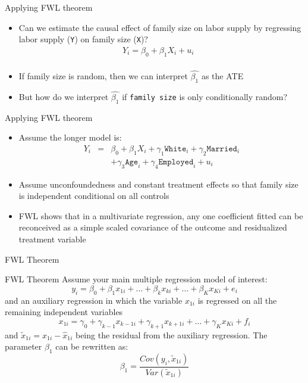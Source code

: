 \documentclass{beamer}
\begin{document}
\begin{frame}{Applying FWL theorem}

	\begin{itemize}
	\item Can we estimate the causal effect of family size on labor supply by regressing labor supply (\texttt{Y}) on family size (\texttt{X})?
		\begin{eqnarray*}
		Y_i = \beta_0 + \beta_1 X_i + u_i&\\
		\end{eqnarray*}
	\item If family size is random, then we can interpret $\widehat{\beta_1}$ as the ATE
	\item But how do we interpret $\widehat{\beta_1}$ if \texttt{family size} is only conditionally random?  
	\end{itemize}
\end{frame}


\begin{frame}{Applying FWL theorem}
	
	\begin{itemize}
	\item Assume the longer model is:
		\begin{eqnarray*}
Y_i &=& \beta_0 + \beta_1 X_i + \gamma_1 \texttt{White}_i + \gamma_2 \texttt{Married}_i \\
		& & + \gamma_3 \texttt{Age}_i + \gamma_4 \texttt{Employed}_i + u_i
		\end{eqnarray*}
	\item Assume unconfoundedness and constant treatment effects so that family size is independent conditional on all controls
	\item FWL shows that in a multivariate regression, any one coefficient fitted can be reconceived as a simple scaled covariance of the outcome and residualized treatment variable
	\end{itemize}
	
\end{frame}




		

\begin{frame}{FWL Theorem}

	\begin{block}{FWL Theorem }
	Assume your main multiple regression model of interest:$$y_i=\beta_0 + \beta_1x_{1i} + \dots + \beta_kx_{ki} + \dots + \beta_Kx_{Ki} + e_i$$ and an auxiliary regression in which the variable $x_{1i}$ is regressed on all the remaining independent variables$$x_{1i} = \gamma_0 + \gamma_{k-1}x_{k-1 i}+\gamma_{k+1}x_{k+1 i} + \dots + \gamma_Kx_{Ki}+f_i$$and $\tilde{x}_{1i} = x_{1i} - \widehat{x}_{1i}$ being the residual from the auxiliary regression. The parameter $\beta_1$ can be rewritten as:$$\beta_1=\frac{Cov(y_i,\tilde{x}_{1i})}{Var(\tilde{x}_{1i})}$$

	\end{block}

\end{frame}
\end{document}
